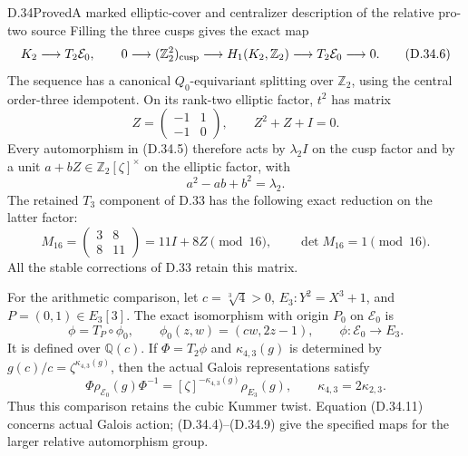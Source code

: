 \begin{statement}{D.34}{Proved}{A marked elliptic-cover and centralizer description of the relative pro-two source}
Filling the three cusps gives the exact map
\[
 K_2\longrightarrow T_2\mathcal E_0,
 \qquad
 0\longrightarrow(\mathbb Z_2^2)_{\rm cusp}
 \longrightarrow H_1(K_2,\mathbb Z_2)
 \longrightarrow T_2\mathcal E_0\longrightarrow0.     \tag{D.34.6}
\]
The sequence has a canonical $Q_0$-equivariant splitting over
$\mathbb Z_2$, using the central order-three idempotent. On its
rank-two elliptic factor, $t^2$ has matrix
\[
 Z=\begin{pmatrix}-1&1\\-1&0\end{pmatrix},\qquad
 Z^2+Z+I=0.                                           \tag{D.34.7}
\]
Every automorphism in (D.34.5) therefore acts by
$\lambda_2 I$ on the cusp factor and by a unit
$a+bZ\in\mathbb Z_2[\zeta]^\times$ on the elliptic factor, with
\[
                    a^2-ab+b^2=\lambda_2.             \tag{D.34.8}
\]
The retained $T_3$ component of D.33 has the following exact reduction
on the latter factor:
\[
 M_{16}=\begin{pmatrix}3&8\\8&11\end{pmatrix}
        =11I+8Z\pmod {16},\qquad\det M_{16}=1\pmod {16}.
                                                               \tag{D.34.9}
\]
All the stable corrections of D.33 retain this matrix.

For the arithmetic comparison, let $c=\sqrt[3]{4}>0$,
$E_3:Y^2=X^3+1$, and $P=(0,1)\in E_3[3]$. The exact isomorphism
with origin $P_0$ on $\mathcal E_0$ is
\[
 \phi=T_P\circ\phi_0,\qquad
 \phi_0(z,w)=(cw,2z-1),\qquad
 \phi:\mathcal E_0\longrightarrow E_3.              \tag{D.34.10}
\]
It is defined over $\mathbb Q(c)$. If $\Phi=T_2\phi$ and
$\kappa_{4,3}(g)$ is determined by $g(c)/c=\zeta^{\kappa_{4,3}(g)}$,
then the actual Galois representations satisfy
\[
 \Phi\rho_{\mathcal E_0}(g)\Phi^{-1}
       =[\zeta]^{-\kappa_{4,3}(g)}\rho_{E_3}(g),
 \qquad\kappa_{4,3}=2\kappa_{2,3}.                   \tag{D.34.11}
\]
Thus this comparison retains the cubic Kummer twist. Equation
(D.34.11) concerns actual Galois action; (D.34.4)--(D.34.9) give the
specified maps for the larger relative automorphism group.
\end{statement}
